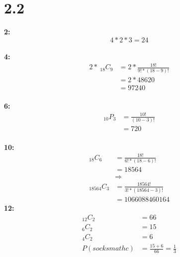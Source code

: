 \documentclass[12pt]{report}
\begin{document}
\section*{2.2}



\indent\textbf{2:}\\
$$4*2*3=24$$\\
\textbf{4:}\\
\begin{align*}
  2*\: _{18}C_{9} &= 2*\frac{18!}{9!*(18-9)!}\\
  &=2*48620\\
  &=97240
\end{align*}\\
\textbf{6:}\\
\begin{align*}
  _{10}P_{3}&=\frac{10!}{(10-3)!}\\
  &=720
\end{align*}\\
\textbf{10:}
\begin{align*}
  _{18}C_{6}&=\frac{18!}{6!*(18-6)!}\\&=18564\\&\Rightarrow\\_{18564}C_{3}&=\frac{18564!}{3!*(18564-3)!}\\&= 1066088460164
\end{align*}         
\textbf{12:}
\begin{align*}
  _{12}C_{2}&=66\\
  _{6}C_{2}&=15\\
  _{4}C_2&=6\\
  P(socks mathc)&=\frac{15+6}{66}=\frac{1}{3}
\end{align*}
\end{document}
